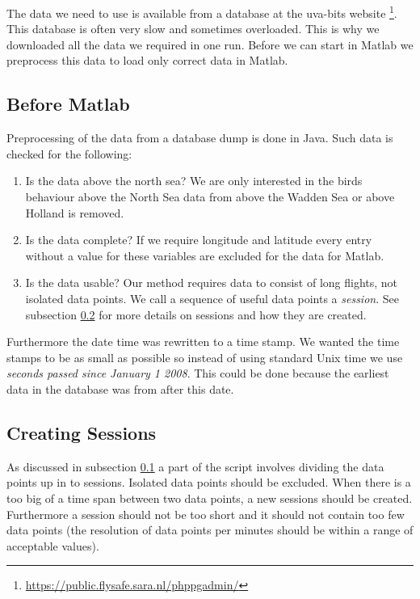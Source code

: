 The data we need to use is available from a database at the uva-bits website
\footnote{\url{https://public.flysafe.sara.nl/phppgadmin/} }. This database is often very slow 
and sometimes overloaded. This is why we downloaded all the data we required in one run. 
Before we can start in Matlab we preprocess this data to load only correct data in Matlab.

\subsection{Before Matlab}
\label{subsec:beforeMatlab}
Preprocessing of the data from a database dump is done in Java. Such data 
is checked for the following: 
\begin{enumerate}
    \item Is the data above the north sea? We are only interested in the birds behaviour 
    above the North Sea data from above the Wadden Sea or above Holland is removed.
    \item Is the data complete? If we require longitude and latitude every entry 
    without a value for these variables are excluded for the data for Matlab. 
    \item Is the data usable? Our method requires data to consist of long flights,
    not isolated data points. We call a sequence of useful data points a \textit{session}. 
    See subsection \ref{subsec:creatingSessions} for more details on sessions and how
    they are created.
\end{enumerate}

Furthermore the date time was rewritten to a time stamp. We wanted the time stamps to be 
as small as possible so instead of using standard Unix time we use \textit{seconds passed
since 
January 1 2008}. This could be done because the earliest data in the database was from after
this date. 

\subsection{Creating Sessions}
\label{subsec:creatingSessions}
As discussed in subsection \ref{subsec:beforeMatlab} a part of the script involves 
dividing the data points up in to sessions. Isolated data points should be excluded. 
When there is a too big of a time span between two data points, a new sessions should be 
created. Furthermore a session should not be too short and it should not contain too few
data points (the resolution of data points per minutes should be within a range of 
acceptable values). 


